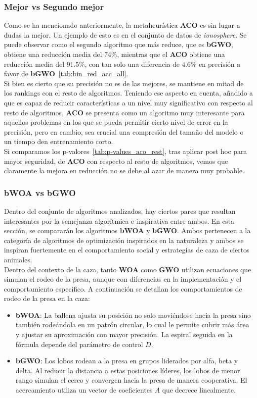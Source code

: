 \subsubsection{Mejor vs Segundo mejor}
Como se ha mencionado anteriormente, la metaheurística \textbf{ACO} es sin lugar a dudas la mejor.
Un ejemplo de esto es en el conjunto de datos de \textit{ionosphere}. Se puede observar como el segundo algoritmo que más reduce, que es \textbf{bGWO}, obtiene una reducción media del $74\%$, mientras que el \textbf{ACO} obtiene una reducción media del $91.5\%$, con tan solo una diferencia de $4.6\%$ en precisión a favor de \textbf{bGWO}~\ref{tab:bin_red_acc_all}. \\[6pt]
Si bien es cierto que su precisión no es de las mejores, se mantiene en mitad de los rankings con el resto de algoritmos. Teniendo ese aspecto en cuenta, añadido a que es capaz de reducir características a un nivel muy significativo con respecto al resto de algoritmos, \textbf{ACO} se presenta como un algoritmo muy interesante para aquellos problemas en los que se pueda permitir cierto nivel de error en la precisión, pero en cambio, sea crucial una compresión del tamaño del modelo o un tiempo den entrenamiento corto.\\[6pt]

Si comparamos los p-valores~\ref{tab:p-values_aco_rest}, tras aplicar post hoc para mayor seguridad, de \textbf{ACO} con respecto al resto de algoritmos, vemos que claramente la mejora en reducción no se debe al azar de manera muy probable.

\subsubsection{bWOA vs bGWO}
Dentro del conjunto de algoritmos analizados, hay ciertos pares que resultan interesantes por la semejanza algorítmica e inspirativa entre ambos. En esta sección, se compararán los algoritmos \textbf{bWOA} y \textbf{bGWO}. Ambos pertenecen a la categoría de algoritmos de optimización inspirados en la naturaleza y ambos se inspiran fuertemente en el comportamiento social y estrategias de caza de ciertos animales.\\[6pt]
Dentro del contexto de la caza, tanto \textbf{WOA} como \textbf{GWO} utilizan ecuaciones que simulan el rodeo de la presa, aunque con diferencias en la implementación y el comportamiento específico. A continuación se detallan los comportamientos de rodeo de la presa en la caza:
\begin{itemize}
    \item \textbf{bWOA}: La ballena ajusta su posición no solo moviéndose hacia la presa sino también rodeándola en un patrón circular, lo cual le permite cubrir más área y ajustar su aproximación con mayor precisión. La espiral seguida en la fórmula depende del parámetro de control $D$.
    \item \textbf{bGWO}: Los lobos rodean a la presa en grupos liderados por alfa, beta y delta. Al reducir la distancia a estas posiciones líderes, los lobos de menor rango simulan el cerco y convergen hacia la presa de manera cooperativa. El acercamiento utiliza un vector de coeficientes $A$ que decrece linealmente.
\end{itemize}

